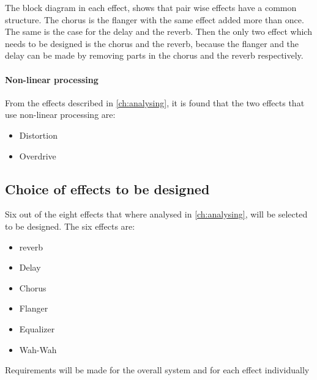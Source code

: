 The block diagram in each effect, shows that pair wise effects have a common structure. The chorus is the flanger with the same effect added more than once. The same is the case for the delay and the \gls{reverb}. Then the only two effect which needs to be designed is the chorus and the \gls{reverb}, because the flanger and the delay can be made by removing parts in the chorus and the \gls{reverb} respectively.

\paragraph{Non-linear processing}
From the effects described in \autoref{ch:analysing}, it is found that the two effects that use non-linear processing are:
\begin{itemize}
	\item Distortion
	\item Overdrive
\end{itemize} 

\subsection{Choice of effects to be designed}
Six out of the eight effects that where analysed in \autoref{ch:analysing}, will be selected to be designed. The six effects are:
\begin{itemize}
	\item \gls{reverb}
	\item Delay
	\item Chorus
	\item Flanger
	\item Equalizer
	\item Wah-Wah
\end{itemize}

Requirements will be made for the overall system and for each effect individually 
 
 